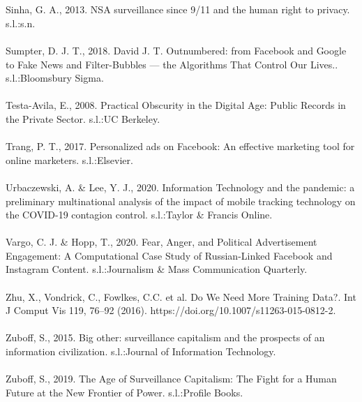 \documentclass[11pt]{article}
\begin{document}
\\ \\
Sinha, G. A., 2013. NSA surveillance since 9/11 and the human right to privacy. s.l.:s.n.
\\ \\
Sumpter, D. J. T., 2018. David J. T. Outnumbered: from Facebook and Google to Fake News and Filter-Bubbles — the Algorithms That Control Our Lives.. s.l.:Bloomsbury Sigma.
\\ \\
Testa-Avila, E., 2008. Practical Obscurity in the Digital Age: Public Records in the Private Sector. s.l.:UC Berkeley.
\\ \\
Trang, P. T., 2017. Personalized ads on Facebook: An effective marketing tool for online marketers. s.l.:Elsevier.
\\ \\
Urbaczewski, A. \& Lee, Y. J., 2020. Information Technology and the pandemic: a preliminary multinational analysis of the impact of mobile tracking technology on the COVID-19 contagion control. s.l.:Taylor \& Francis Online.
\\ \\
Vargo, C. J. \& Hopp, T., 2020. Fear, Anger, and Political Advertisement Engagement: A Computational Case Study of Russian-Linked Facebook and Instagram Content. s.l.:Journalism \& Mass Communication Quarterly.
\\ \\
Zhu, X., Vondrick, C., Fowlkes, C.C. et al. Do We Need More Training Data?. Int J Comput Vis 119, 76–92 (2016). https://doi.org/10.1007/s11263-015-0812-2. 
\\ \\
Zuboff, S., 2015. Big other: surveillance capitalism and the prospects of an information civilization. s.l.:Journal of Information Technology.
\\ \\
Zuboff, S., 2019. The Age of Surveillance Capitalism: The Fight for a Human Future at the New Frontier of Power. s.l.:Profile Books.
\end{document}
